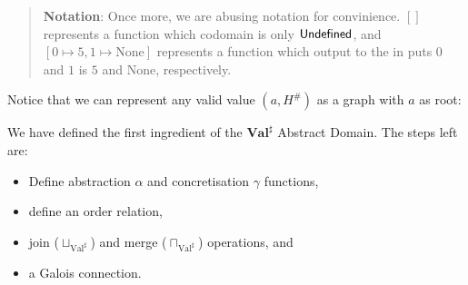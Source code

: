 %

\begin{quote}
  \textbf{Notation}: Once more, we are abusing notation for convinience. \([]\) represents
  a function which codomain is only \(\mathsf{Undefined}\), and
  \([0 \mapsto 5, 1 \mapsto \text{None}]\) represents a function which output to the in
  puts \(0\) and \(1\) is \(5\) and \(\text{None}\), respectively.
\end{quote}

Notice that we can represent any valid value \((a, H^\#)\) as a graph
with \(a\) as root:


%
%
%
%
%
%

We have defined the first ingredient of the \(\mathbf{Val}^\sharp\) Abstract Domain. The
steps left are:

\begin{itemize}
\tightlist
\item Define abstraction \(\alpha\) and concretisation \(\gamma\) functions,
\item define an order relation,
\item join (\(\sqcup_{\text{Val}^\sharp}\)) and merge (\(\sqcap_{\text{Val}^\sharp}\))
  operations, and
\item a Galois connection.
\end{itemize}

